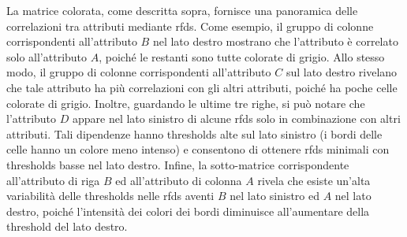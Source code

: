 La matrice colorata, come descritta sopra, fornisce una panoramica delle correlazioni tra attributi mediante \acrfull{rfds}. Come esempio, il gruppo di colonne corrispondenti all'attributo $B$ nel lato destro mostrano che l'attributo \`{e} correlato solo all'attributo $A$, poich\'{e} le restanti sono tutte colorate di grigio. Allo stesso modo, il gruppo di colonne corrispondenti all'attributo $C$ sul lato destro rivelano che tale attributo ha pi\`{u} correlazioni con gli altri attributi, poich\'{e} ha poche celle colorate di grigio. Inoltre, guardando le ultime tre righe, si pu\`{o} notare che l'attributo $D$ appare nel lato sinistro di alcune \acrfull{rfds} solo in combinazione con altri attributi. Tali dipendenze hanno thresholds alte sul lato sinistro (i bordi delle celle hanno un colore meno intenso) e consentono di ottenere \acrfull{rfds} minimali con thresholds basse nel lato destro. Infine, la sotto-matrice corrispondente all'attributo di riga $B$ ed all'attributo di colonna $A$ rivela che esiste un'alta variabilit\`{a} delle thresholds nelle \acrfull{rfds} aventi $B$ nel lato sinistro ed $A$ nel lato destro, poich\'{e} l'intensit\`{a} dei colori dei bordi diminuisce all'aumentare della threshold del lato destro.

